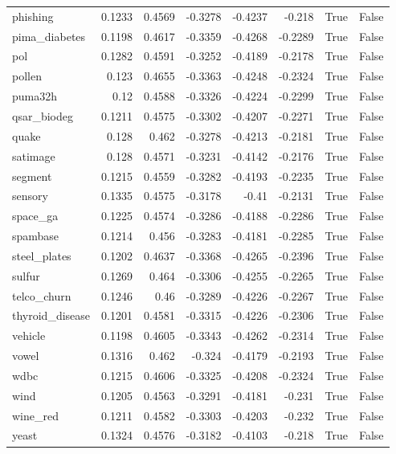 \begin{table}
\begin{tabular}{lrrrrrrr}
phishing & 0.1233 & 0.4569 & -0.3278 & -0.4237 & -0.218 & True & False \\
pima\_diabetes & 0.1198 & 0.4617 & -0.3359 & -0.4268 & -0.2289 & True & False \\
pol & 0.1282 & 0.4591 & -0.3252 & -0.4189 & -0.2178 & True & False \\
pollen & 0.123 & 0.4655 & -0.3363 & -0.4248 & -0.2324 & True & False \\
puma32h & 0.12 & 0.4588 & -0.3326 & -0.4224 & -0.2299 & True & False \\
qsar\_biodeg & 0.1211 & 0.4575 & -0.3302 & -0.4207 & -0.2271 & True & False \\
quake & 0.128 & 0.462 & -0.3278 & -0.4213 & -0.2181 & True & False \\
satimage & 0.128 & 0.4571 & -0.3231 & -0.4142 & -0.2176 & True & False \\
segment & 0.1215 & 0.4559 & -0.3282 & -0.4193 & -0.2235 & True & False \\
sensory & 0.1335 & 0.4575 & -0.3178 & -0.41 & -0.2131 & True & False \\
space\_ga & 0.1225 & 0.4574 & -0.3286 & -0.4188 & -0.2286 & True & False \\
spambase & 0.1214 & 0.456 & -0.3283 & -0.4181 & -0.2285 & True & False \\
steel\_plates & 0.1202 & 0.4637 & -0.3368 & -0.4265 & -0.2396 & True & False \\
sulfur & 0.1269 & 0.464 & -0.3306 & -0.4255 & -0.2265 & True & False \\
telco\_churn & 0.1246 & 0.46 & -0.3289 & -0.4226 & -0.2267 & True & False \\
thyroid\_disease & 0.1201 & 0.4581 & -0.3315 & -0.4226 & -0.2306 & True & False \\
vehicle & 0.1198 & 0.4605 & -0.3343 & -0.4262 & -0.2314 & True & False \\
vowel & 0.1316 & 0.462 & -0.324 & -0.4179 & -0.2193 & True & False \\
wdbc & 0.1215 & 0.4606 & -0.3325 & -0.4208 & -0.2324 & True & False \\
wind & 0.1205 & 0.4563 & -0.3291 & -0.4181 & -0.231 & True & False \\
wine\_red & 0.1211 & 0.4582 & -0.3303 & -0.4203 & -0.232 & True & False \\
yeast & 0.1324 & 0.4576 & -0.3182 & -0.4103 & -0.218 & True & False \\
\bottomrule
\end{tabular}
\end{table}

